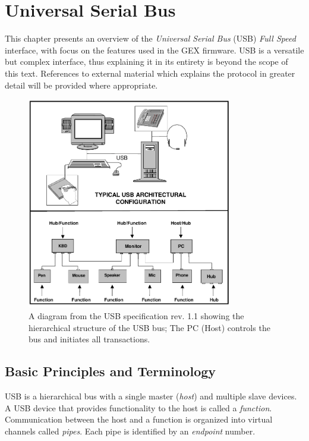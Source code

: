 \chapter{Universal Serial Bus}

This chapter presents an overview of the \textit{Universal Serial Bus} (USB) \textit{Full Speed} interface, with focus on the features used in the GEX firmware. USB is a versatile but complex interface, thus explaining it in its entirety is beyond the scope of this text. References to external material which explains the protocol in greater detail will be provided where appropriate.

\begin{figure}[H]
	\centering
	\includegraphics[width=0.8\textwidth] {img/usb-hierarchy.png}
	\caption{\label{fig:usb-hierarchy}A diagram from the USB specification rev. 1.1 showing the hierarchical structure of the USB bus; The PC (Host) controls the bus and initiates all transactions.}
\end{figure}

\section{Basic Principles and Terminology}


USB is a hierarchical bus with a single master (\textit{host}) and multiple slave devices. A USB device that provides functionality to the host is called a \textit{function}. Communication between the host and a function is organized into virtual channels called \textit{pipes}. Each pipe is identified by an \textit{endpoint} number.

